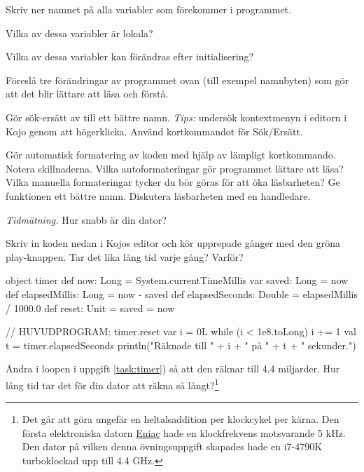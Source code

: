\Subtask\Pen Skriv ner namnet på alla variabler som förekommer i programmet.

\Subtask\Pen Vilka av dessa variabler är lokala?

\Subtask\Pen Vilka av dessa variabler kan förändras efter initialisering?

\Subtask\Pen Föreslå tre förändringar av programmet ovan (till exempel namnbyten) som gör att det blir lättare att läsa och förstå.

\Subtask Gör sök-ersätt av  till ett bättre namn. \emph{Tips:} undersök kontextmenyn i editorn i Kojo genom att högerklicka. Använd kortkommandot för Sök/Ersätt.

\Subtask Gör automatisk formatering av koden med hjälp av lämpligt kortkommando. Notera skillnaderna. Vilka autoformateringar gör programmet lättare att läsa? Vilka manuella formateringar tycker du bör göras för att öka läsbarheten? Ge funktionen  ett bättre namn.  Diskutera läsbarheten med en handledare.



\Task \label{task:measuretime} \emph{Tidmätning.} Hur snabb är din dator?

\Subtask \label{task:timer} Skriv in koden nedan i Kojos editor och kör upprepade gånger med den gröna play-knappen. Tar det lika lång tid varje gång? Varför?

\begin{Code}
object timer {
  def now: Long = System.currentTimeMillis
  var saved: Long = now
  def elapsedMillis: Long = now - saved
  def elapsedSeconds: Double = elapsedMillis / 1000.0
  def reset: Unit = { saved = now }
}

// HUVUDPROGRAM:
timer.reset
var i = 0L
while (i < 1e8.toLong) { i += 1 }
val t = timer.elapsedSeconds
println("Räknade till " + i + " på " + t + " sekunder.")
\end{Code}


\Subtask Ändra i loopen i uppgift \ref{task:timer}) så att den räknar till 4.4 miljarder. Hur lång tid tar det för din dator att räkna så långt?\footnote{Det går att göra ungefär en heltalsaddition per klockcykel per kärna. Den första elektroniska datorn \href{https://sv.wikipedia.org/wiki/ENIAC}{Eniac} hade en klockfrekvens motsvarande 5 kHz. Den dator på vilken denna övningsuppgift skapades hade en i7-4790K turboklockad upp till 4.4 GHz.
}

